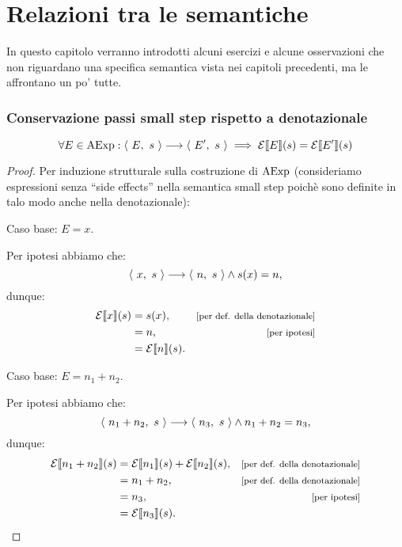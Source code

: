 \chapter{Relazioni tra le semantiche}
In questo capitolo verranno introdotti alcuni esercizi e alcune osservazioni
che non riguardano una specifica semantica vista nei capitoli precedenti,
ma le affrontano un po' tutte.

\subsection{Conservazione passi small step rispetto a denotazionale}

\begin{proposizione}
\label{conservazione-passi-small-step-expr}
\[
  \forall E \in \mathrm{AExp} \mathrel{:} \langle\ E,\ s\ \rangle \longrightarrow \langle\ E',\ s\ \rangle
  \implies \mathcal{E}\llbracket E \rrbracket(s) = \mathcal{E}\llbracket E' \rrbracket(s)
\]

\begin{proof}
Per induzione strutturale sulla costruzione di $\mathrm{AExp}$ (consideriamo
espressioni senza ``side effects'' nella semantica small step poichè sono
definite in talo modo anche nella denotazionale):

Caso base: $E = x$.

Per ipotesi abbiamo che:
\[
  \langle\ x,\ s\ \rangle \longrightarrow \langle\ n,\ s\ \rangle \land s(x) = n,
\]
dunque:
\begin{align*}
  \calE\llbracket x \rrbracket(s) &= s(x),
    &\law{per def. della denotazionale} \\
  &= n,
    &\law{per ipotesi} \\
  &= \calE\llbracket n \rrbracket(s).
\end{align*}

Caso base: $E = n_1 + n_2$.

Per ipotesi abbiamo che:
\[
  \langle\ n_1 + n_2,\ s\ \rangle \longrightarrow \langle\ n_3,\ s\ \rangle \land n_1 + n_2 = n_3,
\]
dunque:
\begin{align*}
  \calE\llbracket n_1 + n_2 \rrbracket(s)
  &= \calE\llbracket n_1 \rrbracket(s)
  + \calE\llbracket n_2 \rrbracket(s),
    &\law{per def. della denotazionale} \\
  &= n_1 + n_2,
    &\law{per def. della denotazionale} \\
  &= n_3,
    &\law{per ipotesi} \\
  &= \calE\llbracket n_3 \rrbracket(s).
\end{align*}


\end{proof}
\end{proposizione}
